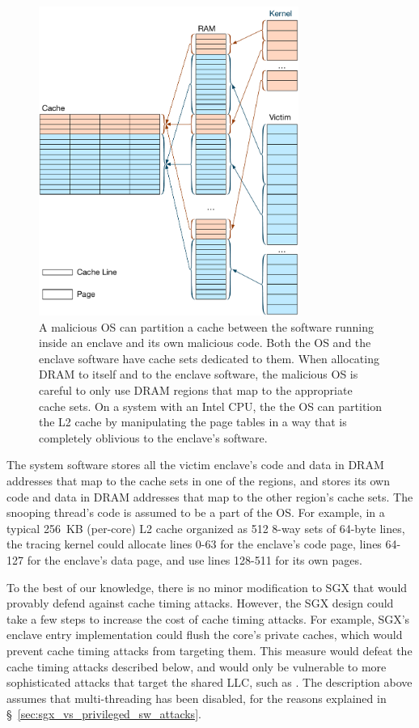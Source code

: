 \begin{figure}[hbt]
  \centering
  \includegraphics[width=85mm]{figures/cache_partitions.pdf}
  \caption{
    A malicious OS can partition a cache between the software running inside an
    enclave and its own malicious code. Both the OS and the enclave software
    have cache sets dedicated to them. When allocating DRAM to itself and to
    the enclave software, the malicious OS is careful to only use DRAM regions
    that map to the appropriate cache sets. On a system with an Intel CPU, the
    the OS can partition the L2 cache by manipulating the page tables in a way
    that is completely oblivious to the enclave's software.
  }
  \label{fig:cache_partitions}
\end{figure}

The system software stores all the victim enclave's code and data in DRAM
addresses that map to the cache sets in one of the regions, and stores its own
code and data in DRAM addresses that map to the other region's cache sets.  The
snooping thread's code is assumed to be a part of the OS. For example, in a
typical 256~KB (per-core) L2 cache organized as 512 8-way sets of 64-byte
lines, the tracing kernel could allocate lines 0-63 for the enclave's code
page, lines 64-127 for the enclave's data page, and use lines 128-511 for its
own pages.

To the best of our knowledge, there is no minor modification to SGX that would
provably defend against cache timing attacks. However, the SGX design could
take a few steps to increase the cost of cache timing attacks. For example,
SGX's enclave entry implementation could flush the core's private caches, which
would prevent cache timing attacks from targeting them. This measure would
defeat the cache timing attacks described below, and would only be vulnerable
to more sophisticated attacks that target the shared LLC, such as
\cite{yarom2013llctiming, liu2015llctiming}. The description above assumes that
multi-threading has been disabled, for the reasons explained in
\S~\ref{sec:sgx_vs_privileged_sw_attacks}.

